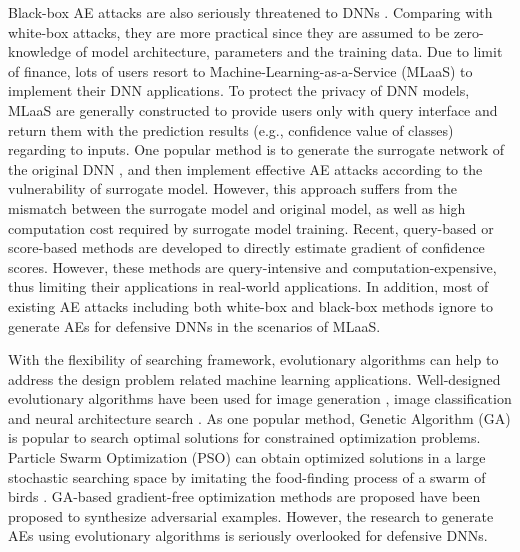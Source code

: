 \documentclass[lettersize,journal]{IEEEtran}
\begin{document}
Black-box AE attacks are also seriously threatened to DNNs \cite{ilyas2018prior}. Comparing with white-box attacks, they are more practical since they are assumed to be zero-knowledge of model architecture, parameters and the training data. Due to limit of finance, lots of users resort to Machine-Learning-as-a-Service (MLaaS) to implement their DNN applications. To protect the privacy of DNN models, MLaaS are generally constructed to provide users only with query interface and return them with the prediction results (e.g., confidence value of classes) regarding to inputs. One popular method is to generate the surrogate network of the original DNN \cite{surrogate}, and then implement effective AE attacks according to the vulnerability of surrogate model. However, this approach suffers from the mismatch between the surrogate model and original model, as well as high computation cost required by surrogate model training. Recent, query-based \cite{2018Query} or score-based \cite{2020MetaSimulator}\cite{9239350} methods are developed to directly estimate gradient of confidence scores. However, these methods are query-intensive and computation-expensive, thus limiting their applications in real-world applications. In addition, most of existing AE attacks including both white-box and black-box methods ignore to generate AEs for defensive DNNs in the scenarios of MLaaS. 

With the flexibility of searching framework, evolutionary algorithms can help to address the design problem related machine learning applications. Well-designed evolutionary algorithms have been used for image generation \cite{DBLP:journals/tec/WangXYT19}, image classification \cite{DBLP:journals/tec/BiXZ22a} \cite{DBLP:journals/tec/SunXZY20} and neural architecture search \cite{DBLP:journals/tec/ONeillXZ21}. As one popular method, Genetic Algorithm (GA) is popular to search optimal solutions for constrained optimization problems. Particle Swarm Optimization (PSO) can obtain optimized solutions in a large stochastic searching space by imitating the food-finding process of a swarm of birds \cite{PSO}. GA-based gradient-free optimization methods \cite{alzantot2019genattack} are proposed have been proposed to synthesize adversarial examples.  However, the research to generate AEs using evolutionary algorithms is seriously overlooked for defensive DNNs.    
\end{document}

